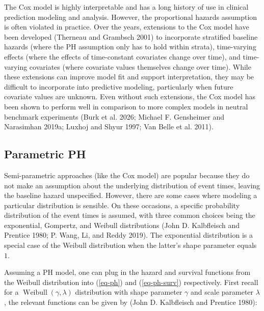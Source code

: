 \documentclass[
  letterpaper,
  krantz2]{style/krantz}
\begin{document}
The Cox model is highly interpretable and has a long history of use in
clinical prediction modeling and analysis. However, the proportional
hazards assumption is often violated in practice. Over the years,
extensions to the Cox model have been developed (Therneau and Grambsch
2001) to incorporate stratified baseline hazards (where the PH
assumption only has to hold within strata), time-varying effects (where
the effects of time-constant covariates change over time), and
time-varying covariates (where covariate values themselves change over
time). While these extensions can improve model fit and support
interpretation, they may be difficult to incorporate into predictive
modeling, particularly when future covariate values are unknown. Even
without such extensions, the Cox model has been shown to perform well in
comparison to more complex models in neutral benchmark experiments (Burk
et al. 2026; Michael F. Gensheimer and Narasimhan 2019a; Luxhoj and
Shyur 1997; Van Belle et al. 2011).

\subsection{Parametric PH}\label{sec-ph-parametric}

Semi-parametric approaches (like the Cox model) are popular because they
do not make an assumption about the underlying distribution of event
times, leaving the baseline hazard unspecified. However, there are some
cases where modeling a particular distribution is
sensible. On these
occasions, a specific probability distribution of the event times is
assumed, with three common choices being the exponential, Gompertz, and
Weibull distributions (John D. Kalbfleisch and Prentice 1980; P. Wang,
Li, and Reddy
2019).
The exponential distribution is a special case of the Weibull
distribution when the latter's shape parameter equals \(1\).

Assuming a PH model, one can plug in the hazard and survival functions
from the Weibull distribution into (\ref{eq-ph}) and (\ref{eq-ph-surv})
respectively. First recall for a
\(\operatorname{Weibull}(\gamma, \lambda)\) distribution with shape
parameter \(\gamma\) and scale parameter \(\lambda\), the relevant
functions can be given by (John D. Kalbfleisch and Prentice
1980):
\end{document}
